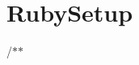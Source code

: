 \chapter{Ruby\+Setup}
\hypertarget{md_markdown_2_setup_2_ruby_setup}{}\label{md_markdown_2_setup_2_ruby_setup}
/\texorpdfstring{$\ast$}{*}\texorpdfstring{$\ast$}{*} 
